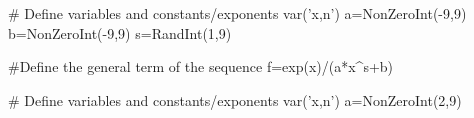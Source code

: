 \begin{sagesilent}
# Define variables and constants/exponents
var('x,n')
a=NonZeroInt(-9,9)
b=NonZeroInt(-9,9)
s=RandInt(1,9)

#Define the general term of the sequence
f=exp(x)/(a*x^s+b)

\end{sagesilent}


\begin{sagesilent}
# Define variables and constants/exponents
var('x,n')
a=NonZeroInt(2,9)

\end{sagesilent}

